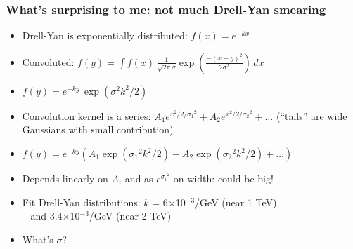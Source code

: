 \documentclass[compress]{beamer}
\begin{document}
\begin{frame}
\frametitle{What's surprising to me: not much Drell-Yan smearing}
\begin{itemize}\setlength{\itemsep}{0.25 cm}
\item<1-> Drell-Yan is exponentially distributed: $f(x) = e^{-kx}$
\item<1-> Convoluted: $\displaystyle f(y) = \int f(x) \, \frac{1}{\sqrt{2\pi}\sigma} \exp\left(\frac{-(x-y)^2}{2\sigma^2}\right) \, dx$
\item<1-> $f(y) = e^{-ky} \, \exp(\sigma^2 k^2 / 2)$
\item<1-> Convolution kernel is a series: $A_1 e^{x^2/2/{\sigma_1}^2} + A_2 e^{x^2/2/{\sigma_2}^2} + \ldots$ (``tails'' are wide Gaussians with small contribution)
\item<1-> $f(y) = e^{-ky} (A_1 \exp({\sigma_1}^2 k^2 / 2) + A_2 \exp({\sigma_2}^2 k^2 / 2) + \ldots)$
\item<1-> Depends linearly on $A_i$ and as $e^{{\sigma_i}^2}$ on width: could be big!
\end{itemize}

\vfill
\begin{itemize}
\item<2->Fit Drell-Yan distributions: \hfill $k$ = 6$\times$10$^{-3}$/GeV (near 1 TeV) \\ \mbox{ } \hfill and 3.4$\times$10$^{-3}$/GeV (near 2 TeV)
\item<2->What's $\sigma$?
\end{itemize}
\end{frame}
\end{document}
